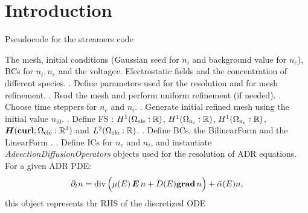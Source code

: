 \documentclass[review,hidelinks,onefignum,onetabnum]{siamart220329}
\begin{document}
\section{Introduction}
%
%
\lipsum[1-2]
%
%
\newpage
%
%
{
  \begin{center}
    \begin{algorithm}
      \small
      \caption{Pseudocode for the streamers code}\label{alg:FE-Streamers}
      \begin{algorithmic}
        \INPUT The mesh, initial conditions (Gaussian seed for $n_i$ and background value for $n_e$), BCs for $n_i, n_e$ and the voltage$v$.
        \OUTPUT Electrostatic fields and the concentration of different species.
            . Define parameters used for the resolution and for mesh refinement.
            \vspace{2mm}
            . Read the mesh and perform uniform refinement (if needed).
            \vspace{2mm}
            . Choose time steppers for $n_e$ and $n_i$.
            \vspace{2mm}
            . Generate initial refined mesh using the initial value $n_{i 0}$.
            \vspace{2mm}
            . Define FS : $\Hone[]{\Omega_{\mathrm{ele}}:\mathbb{R}}$, $\Hone[]{\Omega_{\mathrm{n}_i}:\mathbb{R}}$, $\Hone[]{\Omega_{\mathrm{n}_e}:\mathbb{R}}$, $\Hcurl[]{\Omega_{\mathrm{ele}}:\mathbb{R}^3}$ and $\Ltwo[]{\Omega_{\mathrm{ele}}:\mathbb{R}}$.
            \vspace{2mm}
            . Define BCs, the BilinearForm and the LinearForm .
            \vspace{2mm}
            . Define ICs for $n_e$ and $n_i$, and instantiate \emph{AdvectionDiffusionOperators} objects used for the resolution of ADR equations. For a given ADR PDE:
            \begin{equation*}
              \partial_t n = \Div[]{\Big( \mu(E) \, \bEE \, n + D(E) \Grad[]{n} \Big)} + \bar{\alpha}(E) n,
            \end{equation*}
            this object represents thr RHS of the discretized ODE 

\end{algorithmic}
\end{algorithm}
\end{center}}
\end{document}
